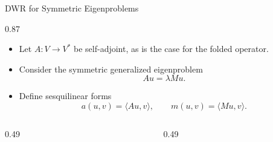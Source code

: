\documentclass[aspectratio=169]{beamer}
\begin{document}
\begin{frame}{DWR for Symmetric Eigenproblems}
\begin{overlayarea}{\textwidth}{0.87\textheight}

\begin{itemize}
    \item<1-> Let $A: V \to V^*$ be self-adjoint, as is the case for the folded operator.
    \item<2-> Consider the symmetric generalized eigenproblem
    \[
        A u = \lambda M u .
    \]
    \item<3-> Define sesquilinear forms
    \[
        a(u,v)=\langle A u,v\rangle,
        \qquad
        m(u,v)=\langle M u,v\rangle .
    \]
\end{itemize}

\vspace{-0.25cm}

\begin{columns}[T,onlytextwidth]
\begin{column}{0.49\textwidth}
\end{column}
\begin{column}{0.49\textwidth}
\end{column}
\end{columns}

\end{overlayarea}
\end{frame}
\end{document}

